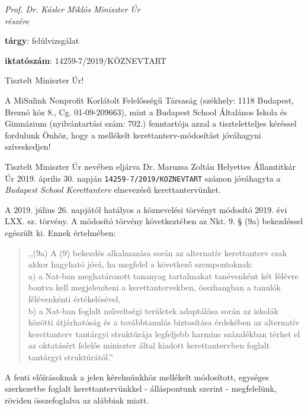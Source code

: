 \pagestyle{empty}

\noindent
\textit{Prof. Dr. Kásler Miklós Miniszter Úr \\
      részére}
\vspace{0.75cm}

\noindent
\textbf{tárgy}: felülvizsgálat

\noindent
\textbf{iktatószám}: 14259-7/2019/KÖZNEVTART
\vspace{0.75cm}

\noindent
Tisztelt Miniszter Úr!
\vspace{0.75cm}

\noindent
A MiSulink Nonprofit Korlátolt Felelősségű Társaság (székhely: 1118 Budapest, Breznó köz 8., Cg. 01-09-209663), mint a Budapest School Általános Iskola és Gimnázium (nyilvántartási szám: 702.) fenntartója azzal a tiszteletteljes kéréssel fordulunk Önhöz, hogy a mellékelt kerettanterv-módosítást jóváhagyni szíveskedjen!

Tisztelt Miniszter Úr nevében eljárva Dr. Maruzsa Zoltán Helyettes Államtitkár Úr 2019. április 30. napján \texttt{14259-7/2019/KOZNEVTART} számon jóváhagyta a \textit{Budapest School Kerettanterv} elnevezésű kerettantervünket.

A 2019. július 26. napjától hatályos a köznevelési törvényt módosító 2019. évi LXX.  sz. törvény. A módosító törvény következtében az Nkt. 9. § (9a) bekezdéssel egészült ki. Ennek értelmében:

\begin{quote}
,,(9a) A (9) bekezdés alkalmazása során az alternatív kerettanterv csak akkor hagyható jóvá, ha megfelel a következő szempontoknak: \\
a) a Nat-ban meghatározott tananyag tartalmakat tanévenként két félévre bontva kell megjeleníteni a kerettantervekben, összhangban a tanulók félévenkénti értékelésével, \\
b) a Nat-ban foglalt műveltségi területek adaptálása során az iskolák közötti átjárhatóság és a továbbtanulás biztosítása érdekében az alternatív kerettanterv tantárgyi struktúrája legfeljebb harminc százalékban térhet el az oktatásért felelős miniszter által kiadott kerettantervben foglalt tantárgyi struktúrától.” \\
\end{quote}

A fenti előírásoknak a jelen kérelmünkhöz mellékelt módosított, egységes szerkezetbe foglalt kerettantervünkkel - álláspontunk szerint - megfelelünk, röviden összefoglalva az alábbiak miatt. 

